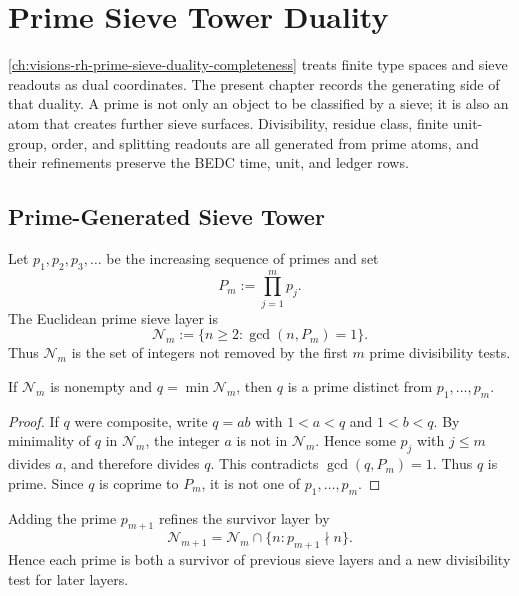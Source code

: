 \chapter{Prime Sieve Tower Duality}
\label{ch:visions-rh-prime-sieve-tower-duality}

\autoref{ch:visions-rh-prime-sieve-duality-completeness} treats finite
type spaces and sieve readouts as dual coordinates.  The present
chapter records the generating side of that duality.  A prime is not
only an object to be classified by a sieve; it is also an atom that
creates further sieve surfaces.  Divisibility, residue class, finite
unit-group, order, and splitting readouts are all generated from prime
atoms, and their refinements preserve the BEDC time, unit, and ledger
rows.

\section{Prime-Generated Sieve Tower}
\label{sec:rh-prime-sieve-tower-generated}

\begin{definition}
\label{def:rh-euclidean-prime-sieve-tower}
Let $p_1,p_2,p_3,\ldots$ be the increasing sequence of primes and set
$$
P_m:=\prod_{j=1}^{m}p_j.
$$
The Euclidean prime sieve layer is
$$
\mathcal N_m
:=
\{n\ge2:\gcd(n,P_m)=1\}.
$$
Thus $\mathcal N_m$ is the set of integers not removed by the first $m$
prime divisibility tests.
\end{definition}

\begin{theorem}
\label{thm:rh-minimal-euclidean-survivor-new-prime}
If $\mathcal N_m$ is nonempty and $q=\min\mathcal N_m$, then $q$ is a
prime distinct from $p_1,\ldots,p_m$.
\end{theorem}

\begin{proof}
If $q$ were composite, write $q=ab$ with $1<a<q$ and $1<b<q$.  By
minimality of $q$ in $\mathcal N_m$, the integer $a$ is not in
$\mathcal N_m$.  Hence some $p_j$ with $j\le m$ divides $a$, and
therefore divides $q$.  This contradicts $\gcd(q,P_m)=1$.  Thus $q$ is
prime.  Since $q$ is coprime to $P_m$, it is not one of
$p_1,\ldots,p_m$.
\end{proof}

\begin{corollary}
\label{cor:rh-prime-atoms-extend-sieve-tower}
Adding the prime $p_{m+1}$ refines the survivor layer by
$$
\mathcal N_{m+1}
=
\mathcal N_m\cap\{n:p_{m+1}\nmid n\}.
$$
Hence each prime is both a survivor of previous sieve layers and a new
divisibility test for later layers.
\end{corollary}

